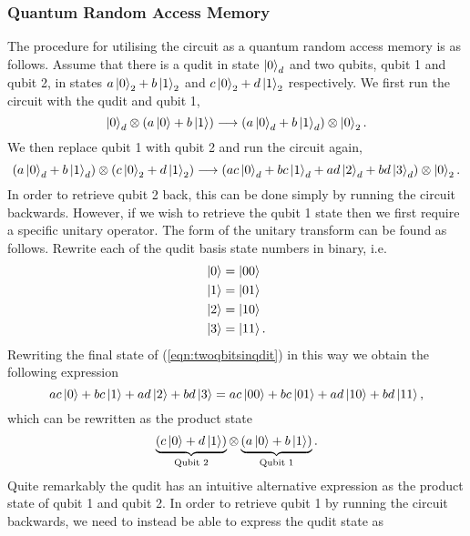 \subsubsection{Quantum Random Access Memory}
\label{subsubsection:qram}
The procedure for utilising the circuit as a quantum random access memory is as follows.
Assume that there is a qudit in state $\ket{0}_d$ and two qubits, qubit 1 and qubit 2, in states $a\ket{0}_2 + b\ket{1}_2$ and $c\ket{0}_2 + d\ket{1}_2$ respectively.
We first run the circuit with the qudit and qubit 1,
\begin{equation}
    \ket{0}_d \otimes \left(a\ket{0} + b\ket{1}\right) \longrightarrow \left(a\ket{0}_d + b\ket{1}_d\right) \otimes \ket{0}_2.
\end{equation}
We then replace qubit 1 with qubit 2 and run the circuit again,
\begin{equation}
    \left(a\ket{0}_d + b\ket{1}_d\right) \otimes \left(c\ket{0}_2 + d\ket{1}_2 \right) \longrightarrow \left(ac\ket{0}_d + bc\ket{1}_d + ad\ket{2}_d + bd\ket{3}_d \right)\otimes\ket{0}_2.
    \label{eqn:twoqbitsinqdit}
\end{equation}
In order to retrieve qubit 2 back, this can be done simply by running the circuit backwards.
However, if we wish to retrieve the qubit 1 state then we first require a specific unitary operator. The form of the unitary transform can be found as follows.
Rewrite each of the qudit basis state numbers in binary, i.e.
\begin{align}
    \ket{0} &= \ket{00}\\
    \ket{1} &= \ket{01}\\
    \ket{2} &= \ket{10}\\
    \ket{3} &= \ket{11}.
\end{align}
Rewriting the final state of (\ref{eqn:twoqbitsinqdit}) in this way we obtain the following expression
\begin{equation}
    ac\ket{0} + bc\ket{1} + ad\ket{2} + bd\ket{3} = ac\ket{00} + bc\ket{01} + ad\ket{10} + bd\ket{11},
    \label{eqn:binaryexpression}
\end{equation}
which can be rewritten as the product state
\begin{equation}
    \underbrace{\left(c\ket{0} + d\ket{1}\right)}_{\text{Qubit 2}} \otimes \underbrace{\left(a\ket{0} + b\ket{1}\right)}_{\text{Qubit 1}}.
\end{equation}
Quite remarkably the qudit has an intuitive alternative expression as the product state of qubit 1 and qubit 2. In order to retrieve qubit 1 by running the circuit backwards, we need to instead be able to express the qudit state as

